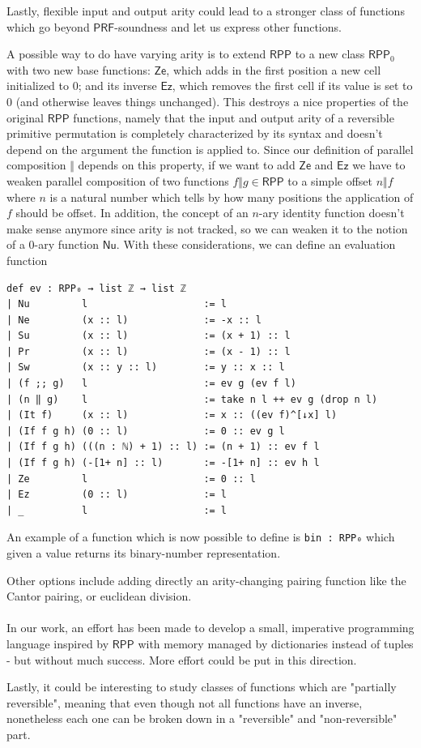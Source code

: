 \documentclass{book}
\theoremstyle{definition}
\theoremstyle{remark}
\theoremstyle{plain}
\newcommand{\RPP}{\mathsf{RPP}}
\newcommand{\rppPa}{\Vert}
\newcommand{\rppNu}{\mathsf{Nu}}
\newcommand{\rppZe}{\mathsf{Ze}}
\newcommand{\rppEz}{\mathsf{Ez}}
\newcommand{\PRF}{\mathsf{PRF}}
\begin{document}
Lastly, flexible input and output arity could lead to a stronger class of functions which
go beyond $\PRF$-soundness and let us express other functions.

A possible way to do have varying arity is to extend $\RPP$ to a new class $\RPP_0$ with two new base functions:
$\rppZe$, which adds in the first position a new cell initialized to $0$;
and its inverse $\rppEz$, which removes the first cell if its value is set to $0$ (and otherwise leaves things unchanged).
This destroys a nice properties of the original $\RPP$ functions,
namely that the input and output arity of a reversible primitive permutation is completely characterized by its syntax
and doesn't depend on the argument the function is applied to.
Since our definition of parallel composition $\rppPa$ depends on this property, if we want to add $\rppZe$ and $\rppEz$
we have to weaken parallel composition of two functions $f \rppPa g \in \RPP$ to a simple offset $n \rppPa f$
where $n$ is a natural number which tells by how many positions the application of $f$ should be offset.
In addition, the concept of an $n$-ary identity function doesn't make sense anymore
since arity is not tracked, so we can weaken it to the notion of a $0$-ary function $\rppNu$.
With these considerations, we can define an evaluation function
\begin{lstlisting}
def ev : RPP₀ → list ℤ → list ℤ
| Nu         l                    := l
| Ne         (x :: l)             := -x :: l
| Su         (x :: l)             := (x + 1) :: l
| Pr         (x :: l)             := (x - 1) :: l
| Sw         (x :: y :: l)        := y :: x :: l
| (f ;; g)   l                    := ev g (ev f l)
| (n ‖ g)    l                    := take n l ++ ev g (drop n l)
| (It f)     (x :: l)             := x :: ((ev f)^[↓x] l)
| (If f g h) (0 :: l)             := 0 :: ev g l
| (If f g h) (((n : ℕ) + 1) :: l) := (n + 1) :: ev f l
| (If f g h) (-[1+ n] :: l)       := -[1+ n] :: ev h l
| Ze         l                    := 0 :: l
| Ez         (0 :: l)             := l
| _          l                    := l
\end{lstlisting}
An example of a function which is now possible to define is \lstinline{bin : RPP₀} which
given a value returns its binary-number representation.

Other options include adding directly an arity-changing pairing function like the Cantor pairing,
or euclidean division.

\paragraph{}

In our work, an effort has been made to develop a small, imperative programming language
inspired by $\RPP$ with memory managed by dictionaries instead of tuples - but without much success.
More effort could be put in this direction.

Lastly, it could be interesting to study classes of functions which are "partially reversible",
meaning that even though not all functions have an inverse, nonetheless each one can be broken down
in a "reversible" and "non-reversible" part.



\end{document}
